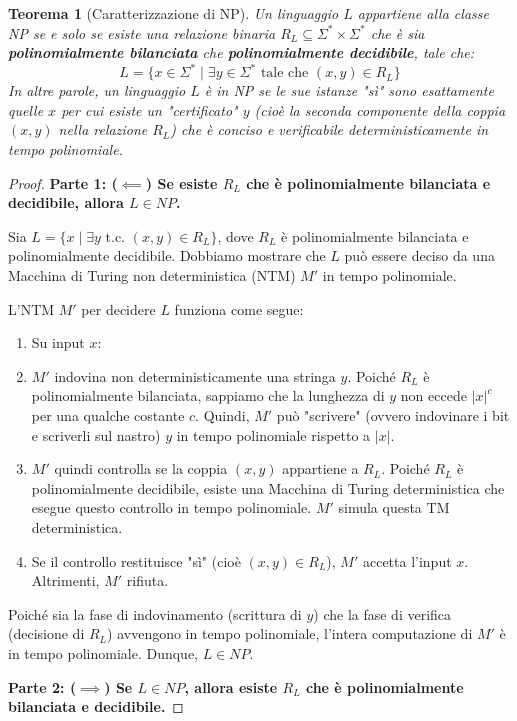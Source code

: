 \documentclass[a4paper]{article}
\newtheorem{theorem}{Teorema}
\begin{document}
\begin{theorem}[Caratterizzazione di NP]
Un linguaggio $L$ appartiene alla classe NP se e solo se esiste una relazione binaria $R_L \subseteq \Sigma^* \times \Sigma^*$ che è sia \textbf{polinomialmente bilanciata} che \textbf{polinomialmente decidibile}, tale che:
\[ L = \{x \in \Sigma^* \mid \exists y \in \Sigma^* \text{ tale che } (x, y) \in R_L \} \]
In altre parole, un linguaggio $L$ è in NP se le sue istanze "sì" sono esattamente quelle $x$ per cui esiste un "certificato" $y$ (cioè la seconda componente della coppia $(x, y)$ nella relazione $R_L$) che è conciso e verificabile deterministicamente in tempo polinomiale.
\end{theorem}

\begin{proof}
\textbf{Parte 1: ($\impliedby$) Se esiste $R_L$ che è polinomialmente bilanciata e decidibile, allora $L \in NP$.}

Sia $L = \{x \mid \exists y \text{ t.c. } (x, y) \in R_L\}$, dove $R_L$ è polinomialmente bilanciata e polinomialmente decidibile.
Dobbiamo mostrare che $L$ può essere deciso da una Macchina di Turing non deterministica (NTM) $M'$ in tempo polinomiale.

L'NTM $M'$ per decidere $L$ funziona come segue:
\begin{enumerate}
    \item Su input $x$:
    \item $M'$ indovina non deterministicamente una stringa $y$. Poiché $R_L$ è polinomialmente bilanciata, sappiamo che la lunghezza di $y$ non eccede $|x|^c$ per una qualche costante $c$. Quindi, $M'$ può "scrivere" (ovvero indovinare i bit e scriverli sul nastro) $y$ in tempo polinomiale rispetto a $|x|$.
    \item $M'$ quindi controlla se la coppia $(x, y)$ appartiene a $R_L$. Poiché $R_L$ è polinomialmente decidibile, esiste una Macchina di Turing deterministica che esegue questo controllo in tempo polinomiale. $M'$ simula questa TM deterministica.
    \item Se il controllo restituisce "sì" (cioè $(x, y) \in R_L$), $M'$ accetta l'input $x$. Altrimenti, $M'$ rifiuta.
\end{enumerate}
Poiché sia la fase di indovinamento (scrittura di $y$) che la fase di verifica (decisione di $R_L$) avvengono in tempo polinomiale, l'intera computazione di $M'$ è in tempo polinomiale. Dunque, $L \in NP$.

\textbf{Parte 2: ($\implies$) Se $L \in NP$, allora esiste $R_L$ che è polinomialmente bilanciata e decidibile.}


\end{proof}
\end{document}
